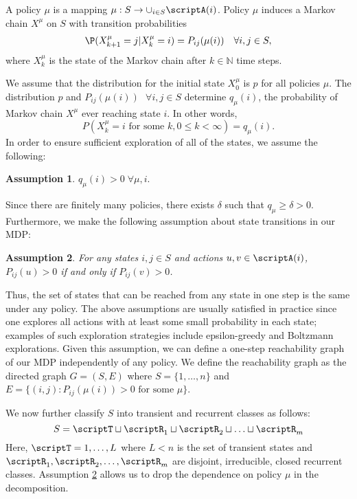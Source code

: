 \documentclass[12pt]{article}
\newtheorem{assumption}{Assumption}
\begin{document}
A policy $\mu$ is a mapping $\mu: S \to \cup_{i\in S} \scriptA(i)$. Policy $\mu$ induces a Markov chain $X^\mu$ on $S$ with transition probabilities
\begin{align*}
\P(X_{k+1}^{\mu} = j | X_k^{\mu} = i) = P_{ij}(\mu(i)) \quad \forall i, j \in S, 
\end{align*} where $X_k^\mu$ is the state of the Markov chain after $k \in \mathbb{N}$ time steps. %

We assume that the distribution for the initial state $X_0^{\mu}$ is $p$ for all policies $\mu$. The distribution $p$ and $P_{ij}(\mu(i)) \text{ } \forall i,j \in S$ determine $q_\mu(i)$, the probability of Markov chain $X^{\mu}$ ever reaching state $i$. In other words,
\begin{equation}
    P(X_k^{\mu} = i \text{ for some } k, 0 \leq k < \infty) = q_\mu(i). \label{q_mu_def}
\end{equation}
In order to ensure sufficient exploration of all of the states, we assume the following:
\begin{assumption}\label{assumption_reachability}
$q_\mu(i) > 0 \;\forall \mu, i.$
\end{assumption} 

Since there are finitely many policies, there exists $\delta$ such that $q_\mu \geq \delta > 0.$ Furthermore, we make the following assumption about state transitions in our MDP:
\begin{assumption}\label{assumption_common_transitions}
    For any states $i, j \in S$ and actions $u, v \in \scriptA(i)$, $P_{ij}(u) > 0$ if and only if $P_{ij}(v) > 0$. 
\end{assumption}
Thus, the set of states that can be reached from any state in one step is the same under any policy. The above assumptions are usually satisfied in practice since one explores all actions with at least some small probability in each state; examples of such exploration strategies include epsilon-greedy and Boltzmann explorations. Given this assumption, we can define a one-step reachability graph of our MDP independently of any policy. We define the reachability graph as the directed graph $G = (S, E)$ where $S = \{1, \ldots, n\}$ and $E = \{(i,j): P_{ij}(\mu(i))>0 \text{ for some } \mu\}$. 

We now further classify $S$ into transient and recurrent classes as follows: 
\begin{equation*}
    S = \scriptT \sqcup \scriptR_1 \sqcup \scriptR_2 \sqcup \ldots \sqcup \scriptR_m 
\end{equation*}
Here, $\scriptT = 1, \ldots, L$ where $L < n$ is the set of transient states and $\scriptR_1, \scriptR_2, \ldots, \scriptR_m$ are disjoint, irreducible, closed recurrent classes.  Assumption \ref{assumption_common_transitions} allows us to drop the dependence on policy $\mu$ in the decomposition.
\end{document}
